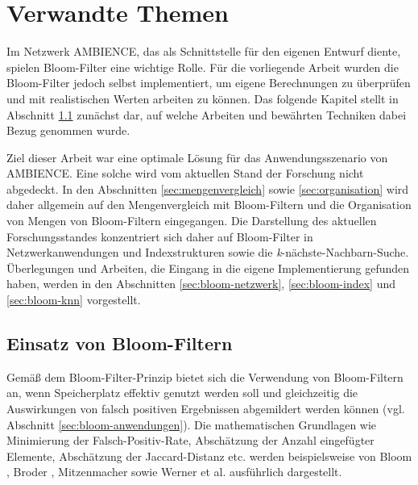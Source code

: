 \chapter{Verwandte Themen}\label{ch:related}
Im Netzwerk AMBIENCE, das als Schnittstelle für den eigenen Entwurf diente, spielen Bloom-Filter eine wichtige Rolle. Für die vorliegende Arbeit wurden die Bloom-Filter jedoch selbst implementiert, um eigene Berechnungen zu überprüfen und mit realistischen Werten arbeiten zu können. Das folgende Kapitel stellt in Abschnitt \ref{sec:bloom-implementierung} zunächst dar, auf welche Arbeiten und bewährten Techniken dabei Bezug genommen wurde.  

Ziel dieser Arbeit war eine optimale Lösung für das Anwendungsszenario von AMBIENCE. Eine solche wird vom aktuellen Stand der Forschung nicht abgedeckt. In den Abschnitten \ref{sec:mengenvergleich} sowie \ref{sec:organisation} wird daher allgemein auf den Mengenvergleich mit Bloom-Filtern und die Organisation von Mengen von Bloom-Filtern eingegangen. Die Darstellung des aktuellen Forschungsstandes konzentriert sich daher auf Bloom-Filter in Netzwerkanwendungen und Indexstrukturen sowie die \textit{k}-nächste-Nachbarn-Suche. Überlegungen und Arbeiten, die Eingang in die eigene Implementierung gefunden haben, werden in den Abschnitten \ref{sec:bloom-netzwerk}, \ref{sec:bloom-index} und \ref{sec:bloom-knn} vorgestellt. 
\section{Einsatz von Bloom-Filtern}\label{sec:bloom-implementierung}
Gemäß dem Bloom-Filter-Prinzip bietet sich die Verwendung von Bloom-Filtern an, wenn Speicherplatz effektiv genutzt werden soll und gleichzeitig die Auswirkungen von falsch positiven Ergebnissen abgemildert werden können (vgl. Abschnitt \ref{sec:bloom-anwendungen}). Die mathematischen Grundlagen wie Minimierung der Falsch-Positiv-Rate, Abschätzung der Anzahl eingefügter Elemente, Abschätzung der Jaccard-Distanz etc. werden beispielsweise von Bloom \cite{Bloom1970}, Broder \cite{Broder2004}, Mitzenmacher \cite{Mitzenmacher2002} sowie Werner et al. \cite{Werner2015} ausführlich dargestellt. 

